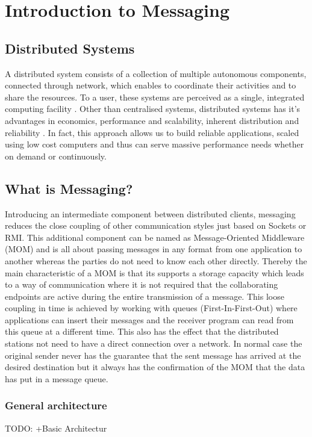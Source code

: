 \chapter{Introduction to Messaging} 
\section{Distributed Systems} 
A distributed system consists of a collection of multiple autonomous components,
connected through network, which enables to coordinate their activities and to
share the resources. To a user, these systems are perceived as a single,
integrated computing facility \cite{TAN06}. Other than centralised systems,
distributed systems has it's advantages in economics, performance and
scalability, inherent distribution and reliability \cite{POSA1}.
In fact, this approach allows us to build reliable applications, 
scaled using low cost computers and thus can serve massive performance needs 
whether on demand or continuously.

\section{What is Messaging?} 
Introducing an intermediate component between distributed
clients, messaging reduces the close coupling of other communication styles just
based on Sockets or RMI. This additional component can be named as
Message-Oriented Middleware (MOM) and is all about passing messages in any
format from one application to another whereas the parties do not need to know
each other directly. Thereby the main characteristic of a MOM is that its
supports a storage capacity which leads to a way of communication where it is
not required that the collaborating endpoints are active during the entire
transmission of a message. This loose coupling in time is achieved by
working with queues (First-In-First-Out) where applications can insert their
messages and the receiver program can read from this queue at a different time.
This also has the effect that the distributed stations not need to
have a direct connection over a network. In normal case the original sender
never has the guarantee that the sent message has arrived at the desired
destination but it always has the confirmation of the MOM that the data has put
in a message queue.  \cite{TAN06} \cite{PprIBMIntro}
 
\subsection{General architecture}
TODO: +Basic Architectur 

